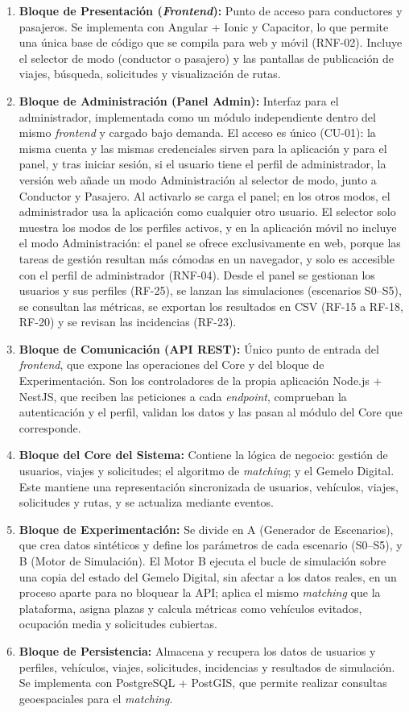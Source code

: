 \begin{enumerate}[label=\alph*)]
    \item \textbf{Bloque de Presentación (\textit{Frontend}):} Punto de acceso para conductores y pasajeros. Se implementa con Angular + Ionic y Capacitor, lo que permite una única base de código que se compila para web y móvil (RNF-02). Incluye el selector de modo (conductor o pasajero) y las pantallas de publicación de viajes, búsqueda, solicitudes y visualización de rutas.
    \item \textbf{Bloque de Administración (Panel Admin):} Interfaz para el administrador, implementada como un módulo independiente dentro del mismo \textit{frontend} y cargado bajo demanda. El acceso es único (CU-01): la misma cuenta y las mismas credenciales sirven para la aplicación y para el panel, y tras iniciar sesión, si el usuario tiene el perfil de administrador, la versión web añade un modo Administración al selector de modo, junto a Conductor y Pasajero. Al activarlo se carga el panel; en los otros modos, el administrador usa la aplicación como cualquier otro usuario. El selector solo muestra los modos de los perfiles activos, y en la aplicación móvil no incluye el modo Administración: el panel se ofrece exclusivamente en web, porque las tareas de gestión resultan más cómodas en un navegador, y solo es accesible con el perfil de administrador (RNF-04). Desde el panel se gestionan los usuarios y sus perfiles (RF-25), se lanzan las simulaciones (escenarios S0--S5), se consultan las métricas, se exportan los resultados en CSV (RF-15 a RF-18, RF-20) y se revisan las incidencias (RF-23).
    \item \textbf{Bloque de Comunicación (API REST):} Único punto de entrada del \textit{frontend}, que expone las operaciones del Core y del bloque de Experimentación. Son los controladores de la propia aplicación Node.js + NestJS, que reciben las peticiones a cada \textit{endpoint}, comprueban la autenticación y el perfil, validan los datos y las pasan al módulo del Core que corresponde.
    \item \textbf{Bloque del Core del Sistema:} Contiene la lógica de negocio: gestión de usuarios, viajes y solicitudes; el algoritmo de \textit{matching}; y el Gemelo Digital. Este mantiene una representación sincronizada de usuarios, vehículos, viajes, solicitudes y rutas, y se actualiza mediante eventos.
    \item \textbf{Bloque de Experimentación:} Se divide en A (Generador de Escenarios), que crea datos sintéticos y define los parámetros de cada escenario (S0--S5), y B (Motor de Simulación). El Motor B ejecuta el bucle de simulación sobre una copia del estado del Gemelo Digital, sin afectar a los datos reales, en un proceso aparte para no bloquear la API; aplica el mismo \textit{matching} que la plataforma, asigna plazas y calcula métricas como vehículos evitados, ocupación media y solicitudes cubiertas.
    \item \textbf{Bloque de Persistencia:} Almacena y recupera los datos de usuarios y perfiles, vehículos, viajes, solicitudes, incidencias y resultados de simulación. Se implementa con PostgreSQL + PostGIS, que permite realizar consultas geoespaciales para el \textit{matching}.
\end{enumerate}

